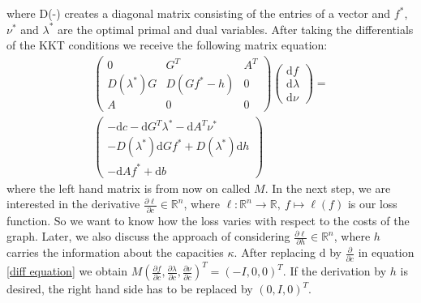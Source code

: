 \documentclass{article}
\begin{document}
{where D(-) creates a diagonal matrix consisting of the entries of a vector and $f^*$, $\nu^*$ and $\lambda^*$ are the optimal primal and dual variables. After taking the differentials of the KKT conditions we receive the following matrix equation:
\begin{align}\label{diff equation} 
\begin{pmatrix} 0 & G^T & A^T \\ D(\lambda^*) G & D(Gf^* -h) & 0 \\ A & 0 & 0 \end{pmatrix}
\begin{pmatrix} \mathrm{d} f \\ \mathrm{d} \lambda \\ \mathrm{d} \nu \end{pmatrix} = \\
\begin{pmatrix} -\mathrm{d}c - \mathrm{d}G^T \lambda^* -\mathrm{d}A^T\nu^* \\ 
-D(\lambda^*)\mathrm d G f^* + D(\lambda^*)\mathrm d h \\
-\mathrm d A f^* + \mathrm d b \end{pmatrix} \nonumber
\end{align}
where the left hand matrix is from now on called $M$.
In the next step, we are interested in the derivative $\frac{\partial \ell}{\partial c}\in \mathbb R ^n$, where $\ell: \mathbb{R}^n \rightarrow \mathbb R,~f\mapsto \ell(f) $ is our loss function. So we want to know how the loss varies with respect to the costs of the graph. Later, we also discuss the approach of considering $\frac{\partial \ell}{\partial h}\in \mathbb R^n$, where $h$ carries the information about the capacities $\kappa$. After replacing $\mathrm{d}$ by $\frac{\partial}{\partial c}$ in equation \eqref{diff equation} we obtain
$M (\frac{\partial f}{\partial c}, \frac{\partial\lambda}{\partial c}, \frac{\partial \nu}{\partial c})^T
= ( -I, 0, 0 )^T.$
If the derivation by $h$ is desired, the right hand side has to be replaced by $(0, I, 0)^T$.
}
\end{document}
